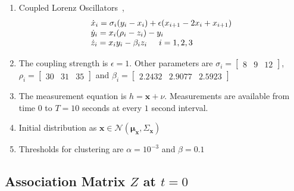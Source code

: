 \begin{enumerate}
\item Coupled Lorenz Oscillators~\cite{lorenz1963deterministic},
\begin{equation}
\label{2d_lorenz}
\begin{array}{l}
\dot{x}_i = \sigma_i(y_i - x_i) +\epsilon(x_{i+1} - 2x_i + x_{i+1}) \\
\dot{y}_i = x_i (\rho_i - z_i) - y_i \\
\dot{z}_i = x_i y_i - \beta_i z_i \hspace{5mm} i = 1,2,3
\end{array}
\end{equation}
\item The coupling strength is $\epsilon = 1$. Other parameters are $\sigma_i = \begin{bmatrix} 8 & 9 & 12 \end{bmatrix}$, $\rho_i = \begin{bmatrix} 30 & 31 & 35 \end{bmatrix}$ and $\beta_i = \begin{bmatrix} 2.2432 & 2.9077 & 2.5923 \end{bmatrix}$
\item The measurement equation is $h = \textbf{x} + \nu$. Measurements are available from time 0 to $T = 10$ seconds at every $1$ second interval.
\item Initial distribution as $\textbf{x} \in \mathcal{N}(\bm{\mu}_{\textbf{x}},\Sigma_{\textbf{x}})$
\item Thresholds for clustering are $\alpha = 10^{-3}$ and $\beta = 0.1$
\end{enumerate}

\subsection{Association Matrix $Z$ at $t = 0$}

